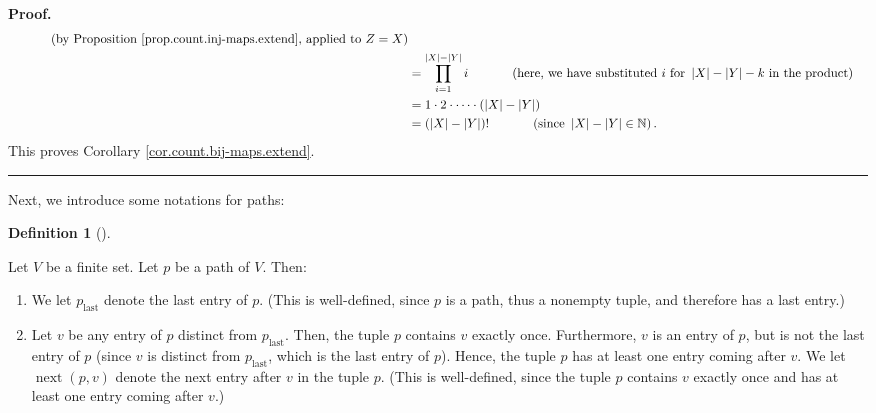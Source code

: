 \documentclass[numbers=enddot,12pt,final,onecolumn,notitlepage]{scrartcl}%
\numberwithin{exer}{section}
\theoremstyle{definition}
\newtheorem{defi}[theo]{Definition}
\newenvironment{definition}[1][]
{\begin{defi}[#1]\begin{leftbar}}
{\end{leftbar}\end{defi}}
\newenvironment{proof}[1][Proof]{\noindent\textbf{#1.} }{\ \rule{0.5em}{0.5em}}
\let\prodnonlimits\prod
\renewcommand{\prod}{\prodnonlimits\limits}
\newenvironment{verlong}{}{}
\begin{document}
\begin{verlong}
\begin{proof}
\begin{align*}
\ \ \ \ \ \ \ \ \ \ \left(  \text{by Proposition
\ref{prop.count.inj-maps.extend}, applied to }Z=X\right) \\
&  =\prod_{i=1}^{\left\vert X\right\vert -\left\vert Y\right\vert
}i\ \ \ \ \ \ \ \ \ \ \left(  \text{here, we have substituted }i\text{ for
}\left\vert X\right\vert -\left\vert Y\right\vert -k\text{ in the
product}\right) \\
&  =1\cdot2\cdot\cdots\cdot\left(  \left\vert X\right\vert -\left\vert
Y\right\vert \right) \\
&  =\left(  \left\vert X\right\vert -\left\vert Y\right\vert \right)
!\ \ \ \ \ \ \ \ \ \ \left(  \text{since }\left\vert X\right\vert -\left\vert
Y\right\vert \in\mathbb{N}\right)  .
\end{align*}
This proves Corollary \ref{cor.count.bij-maps.extend}.
\end{proof}

Next, we introduce some notations for paths:

\begin{definition}
\label{def.linear.Aisg-num.next}Let $V$ be a finite set. Let $p$ be a path of
$V$. Then:

\begin{enumerate}
\item[\textbf{(a)}] We let $p_{\operatorname*{last}}$ denote the last entry of
$p$. (This is well-defined, since $p$ is a path, thus a nonempty tuple, and
therefore has a last entry.)

\item[\textbf{(b)}] Let $v$ be any entry of $p$ distinct from
$p_{\operatorname*{last}}$. Then, the tuple $p$ contains $v$ exactly
once\footnotemark. Furthermore, $v$ is an entry of $p$, but is not the last
entry of $p$ (since $v$ is distinct from $p_{\operatorname*{last}}$, which is
the last entry of $p$). Hence, the tuple $p$ has at least one entry coming
after $v$. We let $\operatorname*{next}\left(  p,v\right)  $ denote the next
entry after $v$ in the tuple $p$. (This is well-defined, since the tuple $p$
contains $v$ exactly once and has at least one entry coming after $v$.)
\end{enumerate}
\end{definition}

\textit{}


\end{verlong}
\end{document}
